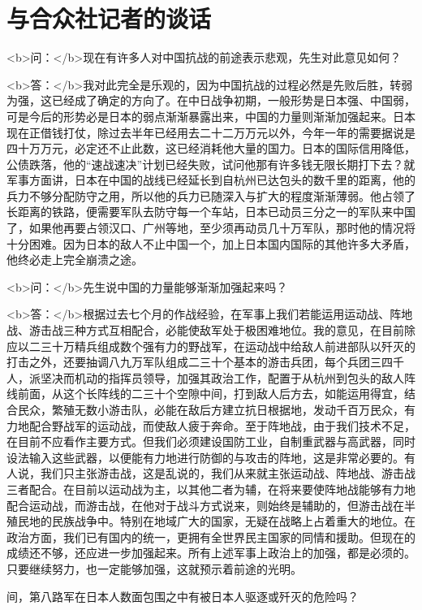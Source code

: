 \section[与合众社记者的谈话（一九三八年二月）]{与合众社记者的谈话}


<b>问：</b>现在有许多人对中国抗战的前途表示悲观，先生对此意见如何？

<b>答：</b>我对此完全是乐观的，因为中国抗战的过程必然是先败后胜，转弱为强，这已经成了确定的方向了。在中日战争初期，一般形势是日本强、中国弱，可是今后的形势必是日本的弱点渐渐暴露出来，中国的力量则渐渐加强起来。日本现在正借钱打仗，除过去半年已经用去二十二万万元以外，今年一年的需要据说是四十万万元，必定还不止此数，这已经消耗他大量的国力。日本的国际信用降低，公债跌落，他的“速战速决”计划已经失败，试问他那有许多钱无限长期打下去？就军事方面讲，日本在中国的战线已经延长到自杭州已达包头的数千里的距离，他的兵力不够分配防守之用，所以他的兵力已随深入与扩大的程度渐渐薄弱。他占领了长距离的铁路，便需要军队去防守每一个车站，日本已动员三分之一的军队来中国了，如果他再要占领汉口、广州等地，至少须再动员几十万军队，那时他的情况将十分困难。因为日本的敌人不止中国一个，加上日本国内国际的其他许多大矛盾，他终必走上完全崩溃之途。

<b>问：</b>先生说中国的力量能够渐渐加强起来吗？

<b>答：</b>根据过去七个月的作战经验，在军事上我们若能运用运动战、阵地战、游击战三种方式互相配合，必能使敌军处于极困难地位。我的意见，在目前除应以二三十万精兵组成数个强有力的野战军，在运动战中给敌人前进部队以歼灭的打击之外，还要抽调八九万军队组成二三十个基本的游击兵团，每个兵团三四千人，派坚决而机动的指挥员领导，加强其政治工作，配置于从杭州到包头的敌人阵线前面，从这个长阵线的二三十个空隙中间，打到敌人后方去，如能运用得宜，结合民众，繁殖无数小游击队，必能在敌后方建立抗日根据地，发动千百万民众，有力地配合野战军的运动战，而使敌人疲于奔命。至于阵地战，由于我们技术不足，在目前不应看作主要方式。但我们必须建设国防工业，自制重武器与高武器，同时设法输入这些武器，以便能有力地进行防御的与攻击的阵地，这是非常必要的。有人说，我们只主张游击战，这是乱说的，我们从来就主张运动战、阵地战、游击战三者配合。在目前以运动战为主，以其他二者为辅，在将来要使阵地战能够有力地配合运动战，而游击战，在他对于战斗方式说来，则始终是辅助的，但游击战在半殖民地的民族战争中。特别在地域广大的国家，无疑在战略上占着重大的地位。在政治方面，我们已有国内的统一，更拥有全世界民主国家的同情和援助。但现在的成绩还不够，还应进一步加强起来。所有上述军事上政治上的加强，都是必须的。只要继续努力，也一定能够加强，这就预示着前途的光明。

间，第八路军在日本人数面包围之中有被日本人驱逐或歼灭的危险吗？

